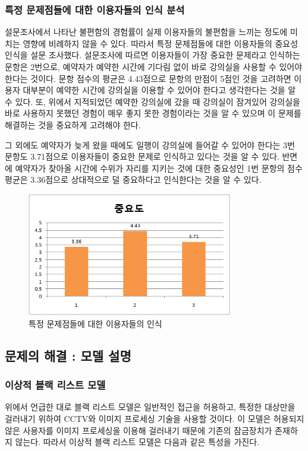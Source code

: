 \documentclass[11pt,a4paper]{article}
\begin{document}
\subsubsection{특정 문제점들에 대한 이용자들의 인식 분석}
설문조사에서 나타난 불편함의 경험률이 실제 이용자들의 불편함을 느끼는 정도에
미치는 영향에 비례하지 않을 수 있다. 따라서 특정 문제점들에 대한 이용자들의
중요성 인식을 설문 조사했다. 설문조사에 따르면 이용자들이 가장 중요한 문제라고
인식하는 문항은 2번으로, 예약자가 예약한 시간에 기다림 없이 바로 강의실을
사용할 수 있어야 한다는 것이다. 문항 점수의 평균은 4.43점으로 문항의 만점이
5점인 것을 고려하면 이용자 대부분이 예약한 시간에 강의실을 이용할 수 있어야
한다고 생각한다는 것을 알 수 있다. 또, 위에서 지적되었던 예약한 강의실에 갔을
때 강의실이 잠겨있어 강의실을 바로 사용하지 못했던 경험이 매우 좋지 못한
경험이라는 것을 알 수 있으며 이 문제를 해결하는 것을 중요하게 고려해야 한다.

그 외에도 예약자가 늦게 왔을 때에도 일행이 강의실에 들어갈 수 있어야 한다는 3번
문항도 3.71점으로 이용자들이 중요한 문제로 인식하고 있다는 것을 알 수 있다.
반면에 예약자가 찾아올 시간에 수위가 자리를 지키는 것에 대한 중요성인 1번
문항의 점수 평균은 3.36점으로 상대적으로 덜 중요하다고 인식한다는 것을 알 수
있다.
\begin{figure}[H]
\includegraphics[width=0.8\textwidth]{4_1_4}
\centering
\caption{특정 문제점들에 대한 이용자들의 인식}
\end{figure}


\subsection{문제의 해결 : 모델 설명}

\subsubsection{이상적 블랙 리스트 모델}
위에서 언급한 대로 블랙 리스트 모델은 일반적인 접근을 허용하고, 특정한 대상만을
걸러내기 위하여 CCTV와 이미지 프로세싱 기술을 사용할 것이다. 이 모델은 허용되지
않은 사용자를 이미지 프로세싱을 이용해 걸러내기 때문에 기존의 잠금장치가
존재하지 않는다. 따라서 이상적 블랙 리스트 모델은 다음과 같은 특성을 가진다.
\end{document}

